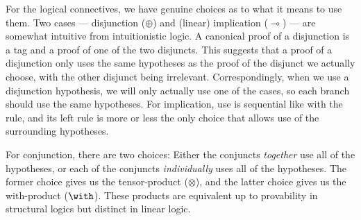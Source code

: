 For the logical connectives, we have genuine choices as to what it means to use
them.
Two cases --- disjunction ($\oplus$) and (linear) implication ($\multimap$) ---
are somewhat intuitive from intuitionistic logic.
A canonical proof of a disjunction is a tag and a proof of one of the two
disjuncts.
This suggests that a proof of a disjunction only uses the same hypotheses as
the proof of the disjunct we actually choose, with the other disjunct being
irrelevant.
Correspondingly, when we use a disjunction hypothesis, we will only actually use
one of the cases, so each branch should use the same hypotheses.
For implication, use is sequential like with the  rule, and its
left rule is more or less the only choice that allows use of the surrounding
hypotheses.

For conjunction, there are two choices: Either the conjuncts \emph{together} use
all of the hypotheses, or each of the conjuncts \emph{individually} uses all of
the hypotheses.
The former choice gives us the tensor-product ($\otimes$), and the latter choice
gives us the with-product ($\with$).
These products are equivalent up to provability in structural logics but
distinct in linear logic.

